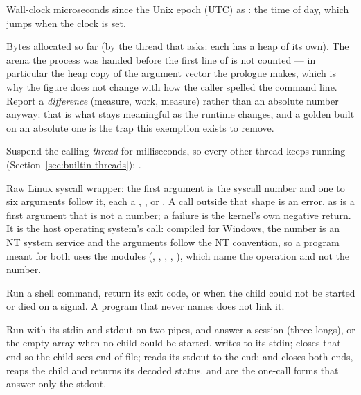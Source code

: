 \begin{description}[style=nextline,leftmargin=5.2em]
\item[\ic{time\_us()}] Wall-clock microseconds since the Unix epoch
  (UTC) as : the time of day, which jumps when the clock is
  set.
\item[\ic{heap\_used()}] Bytes allocated so far (by the thread that
  asks: each has a heap of its own). The arena the process was handed
  before the first line of  is not counted --- in particular the
  heap copy of the argument vector the prologue makes, which is why the
  figure does not change with how the caller spelled the command line.
  Report a \emph{difference} (measure, work, measure) rather than an
  absolute number anyway: that is what stays meaningful as the runtime
  changes, and a golden built on an absolute one is the trap this
  exemption exists to remove.
\item[\ic{sleep(ms)}] Suspend the calling \emph{thread} for 
  milliseconds, so every other thread keeps running
  (Section~\ref{sec:builtin-threads}); .
\item[\ic{syscall(...)}] Raw Linux syscall wrapper: the first argument
  is the syscall number and one to six arguments follow it, each a
  , ,  or . A call outside that shape is
  an error, as is a first argument that is not a number; a failure is the
  kernel's own negative return. It is the host operating system's call:
  compiled for Windows, the number is an NT system service and the arguments
  follow the NT convention, so a program meant for both uses the modules
  (, , , , ), which name the
  operation and not the number.
\item[\ic{exec(cmd)}] Run a shell command, return its exit code, or
   when the child could not be started or died on a signal.
  A program that never names  does not link it.
\item[\ic{popen(cmd)}] Run  with its stdin and stdout on
  two pipes, and answer a session  (three longs), or
  the empty array when no child could be started.  writes
   to its stdin;  closes that end so the child
  sees end-of-file;  reads its stdout to the end; and
   closes both ends, reaps the child and returns its decoded
  status.  and 
  are the one-call forms that answer only the stdout.
\end{description}

